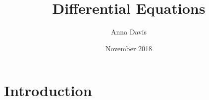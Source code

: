 \documentclass{article}
\title{Differential Equations}
\author{Anna Davis}
\date{November 2018}
\begin{document}
\maketitle

\section{Introduction}
\end{document}
